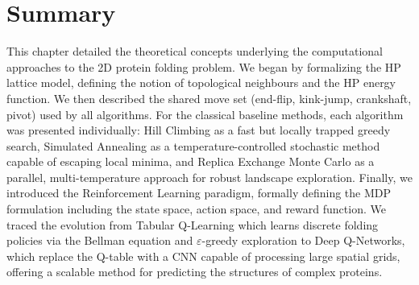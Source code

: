 \section{Summary}
\label{cap2:sec_summary}

This chapter detailed the theoretical concepts underlying the computational approaches to the 2D protein folding problem. We began by formalizing the HP lattice model, defining the notion of topological neighbours and the HP energy function. We then described the shared move set (end-flip, kink-jump, crankshaft, pivot) used by all algorithms. For the classical baseline methods, each algorithm was presented individually: Hill Climbing as a fast but locally trapped greedy search, Simulated Annealing as a temperature-controlled stochastic method capable of escaping local minima, and Replica Exchange Monte Carlo as a parallel, multi-temperature approach for robust landscape exploration. Finally, we introduced the Reinforcement Learning paradigm, formally defining the MDP formulation including the state space, action space, and reward function. We traced the evolution from Tabular Q-Learning which learns discrete folding policies via the Bellman equation and $\varepsilon$-greedy exploration to Deep Q-Networks, which replace the Q-table with a CNN capable of processing large spatial grids, offering a scalable method for predicting the structures of complex proteins.
